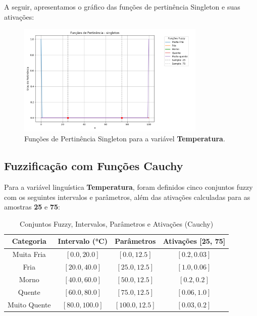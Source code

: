 \documentclass[a4paper,12pt]{article}
\begin{document}
A seguir, apresentamos o gráfico das funções de pertinência Singleton e suas ativações:

\begin{figure}[H]
    \centering
    \includegraphics[width=0.8\textwidth]{img/funções_de_pertinência_singleton_fuzzificado.png}
    \caption{Funções de Pertinência Singleton para a variável \textbf{Temperatura}.}
\end{figure}
\subsection{Fuzzificação com Funções Cauchy}

Para a variável linguística \textbf{Temperatura}, foram definidos cinco conjuntos fuzzy com os seguintes intervalos e parâmetros, além das ativações calculadas para as amostras \textbf{25} e \textbf{75}:

\begin{table}[H]
\centering
\caption{Conjuntos Fuzzy, Intervalos, Parâmetros e Ativações (Cauchy)}
\begin{tabular}{|c|c|c|c|}
\hline
\textbf{Categoria}    & \textbf{Intervalo (°C)} & \textbf{Parâmetros}       & \textbf{Ativações [25, 75]} \\ \hline
Muita Fria            & $[0.0, 20.0]$          & $[0.0, 12.5]$             & $[0.2, 0.03]$              \\ \hline
Fria                  & $[20.0, 40.0]$         & $[25.0, 12.5]$            & $[1.0, 0.06]$              \\ \hline
Morno                 & $[40.0, 60.0]$         & $[50.0, 12.5]$            & $[0.2, 0.2]$               \\ \hline
Quente                & $[60.0, 80.0]$         & $[75.0, 12.5]$            & $[0.06, 1.0]$              \\ \hline
Muito Quente          & $[80.0, 100.0]$        & $[100.0, 12.5]$           & $[0.03, 0.2]$              \\ \hline
\end{tabular}
\end{table}
\end{document}
